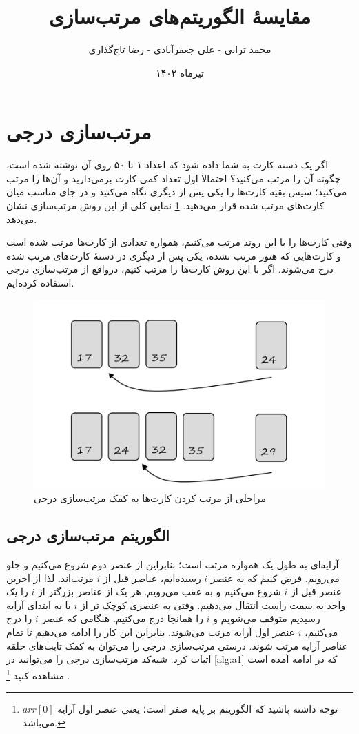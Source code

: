 \documentclass[12pt]{article}
\title{مقایسهٔ الگوریتم‌های مرتب‌سازی}
\author{محمد ترابی - علی جعفر‌آبادی - رضا تاج‌گذاری}
\date{تیرماه ۱۴۰۲}
\begin{document}
\maketitle

\pagebreak

\section{مرتب‌سازی درجی\protect{}}

اگر یک دسته کارت به شما داده شود که اعداد ۱ تا ۵۰ روی آن نوشته شده است، چگونه آن را مرتب
می‌کنید؟
احتمالا اول تعداد کمی کارت برمی‌دارید و آن‌ها را مرتب می‌کنید؛
سپس بقیه کارت‌ها را یکی پس از دیگری نگاه می‌کنید
و در جای مناسب میان کارت‌های مرتب شده قرار می‌دهید.
\cref{fig:f1}
نمایی کلی از این روش مرتب‌سازی نشان می‌دهد.

وقتی کارت‌ها را با این روند مرتب می‌کنیم،
همواره تعدادی از کارت‌ها مرتب شده است و کارت‌هایی که هنوز مرتب نشده، یکی پس از دیگری
در دستهٔ کارت‌های مرتب شده درج
می‌شوند.
اگر با این روش کارت‌ها را مرتب کنیم، درواقع از مرتب‌سازی درجی استفاده کرده‌ایم.

\begin{figure}[H]
  \centering
  \includegraphics[width=.8\textwidth]{figs/sortingCards2.jpg}
  \caption{
    مراحلی از مرتب کردن کارت‌ها به کمک مرتب‌سازی درجی
  }
  \label{fig:f1}
\end{figure}

\subsection*{الگوریتم مرتب‌سازی درجی}
آرایه‌ای به طول یک همواره مرتب است؛ بنابراین از عنصر دوم شروع می‌کنیم و جلو می‌رویم.
فرض کنیم که به عنصر
$i$
رسیده‌ایم،
عناصر قبل از
$i$
مرتب‌اند.
لذا از آخرین عنصر قبل از
$i$
شروع می‌کنیم و به عقب می‌رویم.
هر یک از عناصر بزرگتر از
$i$
را یک واحد به سمت راست انتقال
می‌دهیم.
وقتی به عنصری کوچک تر از
$i$
یا به ابتدای آرایه رسیدیم
متوقف می‌شویم و
$i$
را همانجا درج
می‌کنیم.
هنگامی که عنصر
$i$
را درج می‌کنیم،
$i$
عنصر اول آرایه مرتب می‌شوند.
بنابراین این کار را ادامه می‌دهیم تا تمام عناصر آرایه مرتب شوند.
درستی مرتب‌سازی درجی را می‌توان به کمک ثابت‌های حلقه
اثبات کرد.
\cite{clrs}
شبه‌کد مرتب‌سازی درجی را می‌توانید در
\cref{alg:a1}
که در ادامه آمده است
مشاهده کنید
\footnote{
  توجه داشته باشید که الگوریتم بر پایه صفر است؛ یعنی عنصر اول آرایه
  $arr[0]$
  می‌باشد.
}
.
\end{document}

